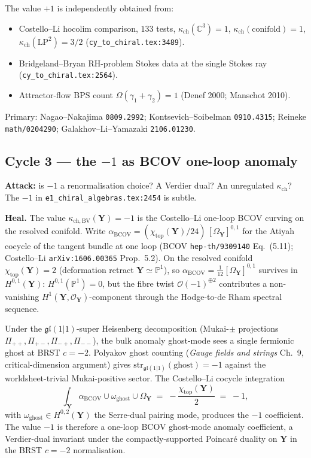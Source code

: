 \documentclass[11pt]{amsart}
\theoremstyle{definition}
\providecommand{\bY}{\mathbf{Y}}
\providecommand{\cO}{\mathcal{O}}
\providecommand{\bC}{\mathbb{C}}
\providecommand{\bP}{\mathbb{P}}
\providecommand{\fgl}{\mathfrak{gl}}
\providecommand{\str}{\mathrm{str}}
\begin{document}
The value $+1$ is independently obtained from:
\begin{itemize}[leftmargin=2em]
\item Costello--Li hocolim comparison, $133$ tests,
  $\kappa_{\mathrm{ch}}(\bC^3) = 1$, $\kappa_{\mathrm{ch}}(\mathrm{conifold})
  = 1$, $\kappa_{\mathrm{ch}}(\mathrm{LP}^2) = 3/2$
  (\texttt{cy\_to\_chiral.tex:3489}).
\item Bridgeland--Bryan RH-problem Stokes data at the single Stokes
  ray (\texttt{cy\_to\_chiral.tex:2564}).
\item Attractor-flow BPS count
  $\Omega(\gamma_1 + \gamma_2) = 1$ (Denef 2000; Manschot 2010).
\end{itemize}

Primary: Nagao--Nakajima \texttt{0809.2992};
Kontsevich--Soibelman \texttt{0910.4315};
Reineke \texttt{math/0204290};
Galakhov--Li--Yamazaki \texttt{2106.01230}.

\subsection*{Cycle 3 --- the $-1$ as BCOV one-loop anomaly}

\textbf{Attack:} is $-1$ a renormalisation choice? A Verdier dual?
An unregulated $\kappa_{\mathrm{ch}}$? The $-1$ in
\texttt{e1\_chiral\_algebras.tex:2454} is subtle.

\textbf{Heal.} The value $\kappa_{\mathrm{ch,BV}}(\bY) = -1$ is the
Costello--Li one-loop BCOV curving on the resolved conifold.
Write $\alpha_{\mathrm{BCOV}} = (\chi_{\mathrm{top}}(\bY)/24)\,
[\Omega_\bY]^{0,1}$ for the Atiyah cocycle of the tangent bundle at
one loop (BCOV \texttt{hep-th/9309140} Eq.~(5.11);
Costello--Li \texttt{arXiv:1606.00365} Prop.~5.2). On the resolved
conifold $\chi_{\mathrm{top}}(\bY) = 2$ (deformation retract
$\bY \simeq \bP^1$), so
$\alpha_{\mathrm{BCOV}} = \tfrac{1}{12}[\Omega_\bY]^{0,1}$ survives
in $H^{0,1}(\bY)$: $H^{0,1}(\bP^1) = 0$, but the fibre twist
$\cO(-1)^{\oplus 2}$ contributes a non-vanishing
$H^1(\bY, \cO_\bY)$-component through the Hodge-to-de Rham
spectral sequence.

Under the $\mathfrak{gl}(1\vert 1)$-super Heisenberg decomposition
(Mukai-$\pm$ projections
$\Pi_{++}, \Pi_{+-}, \Pi_{-+}, \Pi_{--}$), the bulk anomaly
ghost-mode sees a single fermionic ghost at BRST $c = -2$. Polyakov
ghost counting (\emph{Gauge fields and strings} Ch.~9,
critical-dimension argument) gives
$\str_{\fgl(1\vert 1)}(\mathrm{ghost}) = -1$ against the
worldsheet-trivial Mukai-positive sector. The Costello--Li cocycle
integration
\[
 \int_\bY \alpha_{\mathrm{BCOV}} \cup \omega_{\mathrm{ghost}}
  \cup \Omega_\bY
 \;=\; -\frac{\chi_{\mathrm{top}}(\bY)}{2} \;=\; -1,
\]
with $\omega_{\mathrm{ghost}} \in H^{0,2}(\bY)$ the Serre-dual
pairing mode, produces the $-1$ coefficient. The value $-1$ is
therefore a one-loop BCOV ghost-mode anomaly coefficient, a
Verdier-dual invariant under the compactly-supported Poincaré
duality on $\bY$ in the BRST $c = -2$ normalisation.
\end{document}
